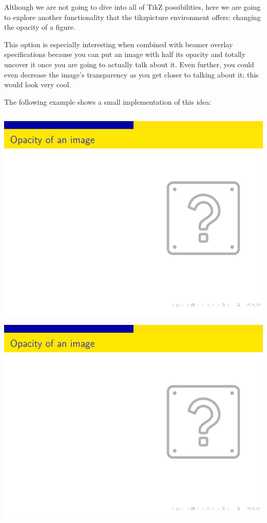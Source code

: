 \begin{column}{0.5\textwidth}
Although we are not going to dive into all of TikZ possibilities, here we are going to explore another functionality that the tikzpicture environment offers: changing the opacity of a figure.

This option is especially interesting when combined with beamer overlay specifications because you can put an image with half its opacity and totally uncover it once you are going to actually talk about it. Even further, you could even decrease the image’s transparency as you get closer to talking about it; this would look very cool.

The following example shows a small implementation of this idea:

\inputminted[linenos=true]{latex}{examples/beamer/figure-opacity-with-tikz.tex}

\includegraphics[page=1]{examples/beamer/figure-opacity-with-tikz.pdf}

\includegraphics[page=2]{examples/beamer/figure-opacity-with-tikz.pdf}


\end{column}
